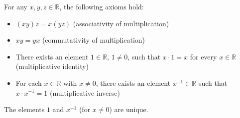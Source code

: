 For any $x, y, z \in \mathbb{R}$, the following axioms hold:
\begin{itemize}
\item[M1.] $(xy)z = x(yz)$ \hfill (associativity of multiplication)
\item[M2.] $xy = yx$ \hfill (commutativity of multiplication)
\item[M3.] There exists an element $1 \in \mathbb{R}$, $1 \neq 0$, such that $x \cdot 1 = x$ for every $x \in \mathbb{R}$ \hfill (multiplicative identity)
\item[M4.] For each $x \in \mathbb{R}$ with $x \neq 0$, there exists an element $x^{-1} \in \mathbb{R}$ such that $x \cdot x^{-1} = 1$ \hfill (multiplicative inverse)
\end{itemize}
The elements $1$ and $x^{-1}$ (for $x \neq 0$) are unique.
